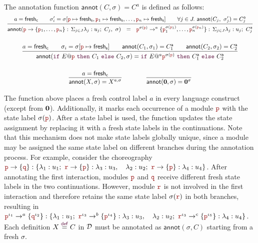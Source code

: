 \begin{definition}[Annotation]\label{def:annot}
  The annotation function $\mathsf{annot}(C,\sigma)=C^a$ is defined as
  follows:\\
  \[
    \begin{array}{c}\small
      \infer
      {
      \mathsf{annot}\!\left(
      \interact{\nr}{\nr_1,\ldots,\nr_n},\ \sigma
      \right)
      \ \ =\ \
      \interactl{\nr^{\sigma(\nr)}}a{\nr_1^{\sigma(\nr_1)},\ldots,\nr_n^{\sigma(\nr_n)}}
      }
      {
      a=\mathsf{fresh}_{\mathsf c}
      \qquad
      \sigma_i'=\sigma[
      \nr\mapsto\mathsf{fresh}_{\mathsf s},
      \nr_1\mapsto\mathsf{fresh}_{\mathsf s},\ldots,
      \nr_n\mapsto\mathsf{fresh}_{\mathsf s}]
      \qquad
      \forall j\in J.\ \mathsf{annot}(C_j,\ \sigma_j')=\anno {C}_j
      }
      \\[6mm]
      \infer
      {
      \mathsf{annot}(\ifTE{E}{\nr}{C_1}{C_2},\sigma)
      =
      \ifTEl{E}a{\nr^{\sigma(\nr)}}{\anno {C}_1}{\anno C_2}
      }
      {
      a=\mathsf{fresh}_{\mathsf c}
      \qquad
      \sigma_i=\sigma[\nr\mapsto\mathsf{fresh}_{\mathsf s}]
      \qquad
      \mathsf{annot}(C_1,\sigma_1)=\anno C_1
      \qquad
      \mathsf{annot}(C_2,\sigma_2)=\anno C_2
      }
      \\[6mm]
      \infer
      {
      \mathsf{annot}(X,\sigma)=X^{a,\sigma}
      }
      {
      a=\mathsf{fresh}_{\mathsf c}
      }
      \qquad\qquad
      \infer
      {
      \mathsf{annot}(\CEnd,\sigma)=\CEnd^{\sigma}
      }
      {
      }
\end{array}
\]
\end{definition}
The function above places a fresh control label $a$ in every language
construct (except from $\mathbf{0}$). Additionally, it marks each
occurrence of a module $\nr$ with the state label $\sigma(\nr)$. After
a state label is used, the function updates the state assignment by
replacing it with a fresh state labels in the continuations. Note that
this mechanism does not make state labels globally unique, since a
module may be assigned the same state label on different branches
during the annotation process.
%
For example, consider the choreography
% 
$
\interactBase{\nr}{\nrr} :
\{\lambda_1:u_1;\ \interactBase{\nrrr}{\nr}: \lambda_3:u_3,\quad
\lambda_2:u_2;\ \interactBase{\nrrr}{\nr}: \lambda_4:u_4\}
$.
% 
After annotating the first interaction, modules $\nr$ and $\nrr$
receive different fresh state labels in the two
continuations. However, module $\nrrr$ is not involved in the first
interaction and therefore retains the same state label $\sigma(\nrrr)$
in both branches, resulting in
% 
$
\interactBasel{\nr^{\iota_1}}a{\nrr^{\iota_2}} :
\{\lambda_1:u_1;\ \interactBasel{\nrrr^{\iota_3}}b{\nr^{\iota_4}}: \lambda_3:u_3,\quad
\lambda_2:u_2;\ \interactBasel{\nrrr^{\iota_3}}c{\nr^{\iota_5}}: \lambda_4:u_4\}
$.
% 
Each definition
$X\stackrel{\textcolor{sh_keyword}{\mathsf{def}}}{=} C$ in $\mathcal D$
must be annotated as $\mathsf{annot}(\sigma, C)$ starting from a fresh
$\sigma$.



